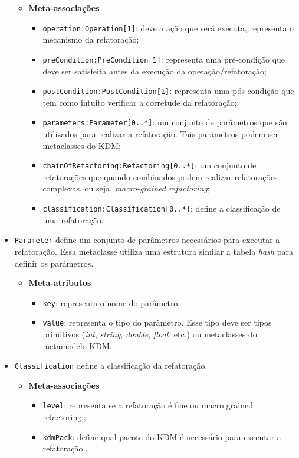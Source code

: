 \begin{itemize}
\begin{itemize}
	\item \textbf{Meta-associações}
		\begin{itemize}
			\item \texttt{operation:Operation[1]}: deve a ação que será executa, representa o mecanismo da refatoração;
			\item \texttt{preCondition:PreCondition[1]}: representa uma pré-condição que deve ser satisfeita antes da execução da operação/refatoração;
			\item \texttt{postCondition:PostCondition[1]}: representa uma pós-condição que tem como intuito verificar a corretude da refatoração;
			\item \texttt{parameters:Parameter[0..*]}: um conjunto de parâmetros que são utilizados para realizar a refatoração. Tais parâmetros podem ser metaclasses do KDM;
			\item \texttt{chainOfRefactoring:Refactoring[0..*]}: um conjunto de refatorações que quando combinados podem realizar refatorações complexas, ou seja, \textit{macro-grained refactoring};
			\item \texttt{classification:Classification[0..*]}: define a classificação de uma refatoração.
		\end{itemize}	
\end{itemize} 

\item \texttt{Parameter} define um conjunto de parâmetros necessários para executar a refatoração. Essa metaclasse utiliza uma estrutura similar a tabela \textit{hash} para definir os parâmetros.

\begin{itemize}
	\item \textbf{Meta-atributos}
		\begin{itemize}
			\item \texttt{key}: representa o nome do parâmetro;
			\item \texttt{value}: representa o tipo do parâmetro. Esse tipo deve ser tipos primitivos (\textit{int}, \textit{string}, \textit{double}, \textit{float}, etc.) ou metaclasses do metamodelo KDM.
		\end{itemize}	
\end{itemize} 

\item \texttt{Classification} define a classificação da refatoração.

\begin{itemize}
	\item \textbf{Meta-associações}
		\begin{itemize}
			\item \texttt{level}: representa se a refatoração é fine ou macro grained refactoring;;
			\item \texttt{kdmPack}: define qual pacote do KDM é necessário para executar a refatoração..
		\end{itemize}	
\end{itemize} 


\end{itemize}
